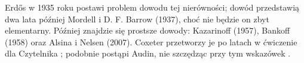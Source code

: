 \begin{figure}[H]
\begin{minipage}[b]{.45\linewidth}
\begin{center}
\begin{comment}
    \tkzLabelPoint[below left](A){$A$}
    \tkzLabelPoint[below right](B){$B$}
    \tkzLabelPoint[above](C){$C$}
    \tkzLabelPoint[above right](Pa){$A_p$}
    \tkzLabelPoint[above left](Pb){$B_p$}
    \tkzLabelPoint[below](Pc){$C_p$}

    \tkzMarkAngle[arc=lll,size=1.2,mark=|||](A,P,Pc)
    \tkzMarkAngle[arc=lll,size=1.2,mark=|||](Pc,P,B)
    \tkzMarkAngle[arc=ll,size=1.2,mark=||](B,P,Pa)
    \tkzMarkAngle[arc=ll,size=1.2,mark=||](Pa,P,C)
    \tkzMarkAngle[arc=l,size=1.2,mark=|](C,P,Pb)
    \tkzMarkAngle[arc=l,size=1.2,mark=|](Pb,P,A)

    \tkzDrawSegments[line width=0.2mm](P,A P,B P,C)
    \tkzDrawSegments[line width=0.2mm,dashed](P,Pa P,Pb P,Pc)
    \tkzDrawPolygon[line width=0.3mm](A,B,C)
    \tkzDrawPoints[size=3,color=black,fill=black!50](A,B,C,P,Pc,Pb,Pa)
\end{tikzpicture}
\end{comment}
    \end{center}
    \label{erdos_mordell_barrowb}
\end{minipage}
\caption{}
\end{figure}

\label{subsection_erdos_mordell}
Erdős w 1935 roku postawi problem dowodu tej nierówności; dowód przedstawią dwa lata później Mordell i D. F. Barrow (1937), choć nie będzie on zbyt elementarny.
%
%
%
Później znajdzie się prostsze dowody: Kazarinoff (1957), Bankoff (1958) oraz Alsina i Nelsen (2007).
Coxeter przetworzy je po latach w ćwiczenie dla Czytelnika \cite[s. 25]{coxeter_1967}; podobnie postąpi Audin, nie szczędząc przy tym wskazówek \cite[s. 102]{audin_2003}.

